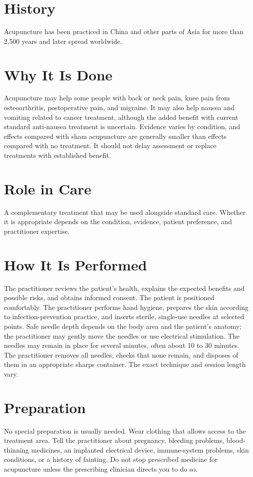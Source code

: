 \section*{History}
Acupuncture has been practiced in China and other parts of Asia for more than 2,500 years and later spread worldwide.

\section*{Why It Is Done}
Acupuncture may help some people with back or neck pain, knee pain from osteoarthritis, postoperative pain, and migraine. It may also help nausea and vomiting related to cancer treatment, although the added benefit with current standard anti-nausea treatment is uncertain. Evidence varies by condition, and effects compared with sham acupuncture are generally smaller than effects compared with no treatment. It should not delay assessment or replace treatments with established benefit.

\section*{Role in Care}
A complementary treatment that may be used alongside standard care. Whether it is appropriate depends on the condition, evidence, patient preference, and practitioner expertise.

\section*{How It Is Performed}
The practitioner reviews the patient's health, explains the expected benefits and possible risks, and obtains informed consent. The patient is positioned comfortably. The practitioner performs hand hygiene, prepares the skin according to infection-prevention practice, and inserts sterile, single-use needles at selected points. Safe needle depth depends on the body area and the patient's anatomy; the practitioner may gently move the needles or use electrical stimulation. The needles may remain in place for several minutes, often about 10 to 30 minutes. The practitioner removes all needles, checks that none remain, and disposes of them in an appropriate sharps container. The exact technique and session length vary.

\section*{Preparation}
No special preparation is usually needed. Wear clothing that allows access to the treatment area. Tell the practitioner about pregnancy, bleeding problems, blood-thinning medicines, an implanted electrical device, immune-system problems, skin conditions, or a history of fainting. Do not stop prescribed medicine for acupuncture unless the prescribing clinician directs you to do so.

